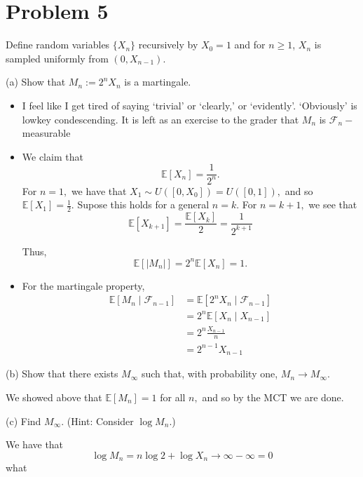 \documentclass[11pt]{article}
\newcommand{\bbE}{\mathbb{E}}
\begin{document}
\newpage

\section*{Problem 5}
Define random variables \(\{X_n\}\) recursively by \(X_0 = 1\) and for \(n \geq 1\), \(X_n\) is sampled uniformly from \((0, X_{n-1})\).

(a) Show that \(M_n := 2^n X_n\) is a martingale.
\begin{solution}
    \begin{itemize}
        \item I feel like I get tired of saying `trivial' or `clearly,' or `evidently'. `Obviously' is lowkey condescending. It is left as an exercise to the grader that $M_n$ is $\mathcal{F}_n-$measurable
        \item We claim that 
        \[\bbE[X_n] = \frac{1}{2^n}.\] For $n=1,$ we have that $X_1 \sim U([0,X_0]) = U([0,1]),$ and so $\bbE[X_1] = \frac{1}{2}.$ Supose this holds for a general $n=k.$ For $n = k+1,$ we see that 
        \[\bbE[X_{k+1}] = \frac{\bbE[X_k]}{2} = \frac{1}{2^{k+1}}\]
        
        Thus, 
        \[\bbE[|M_n|] = 2^n\bbE[X_n] = 1.\]
        \item For the martingale property, 
        \begin{align*}
            \bbE[M_n \mid \mathcal{F}_{n-1}] &= \bbE[2^n X_n \mid \mathcal{F}_{n-1}]\\
            &= 2^n \bbE[X_{n} \mid {X}_{n-1}]\\
            &= 2^n \frac{X_{n-1}}{n}\\
            &= 2^{n-1}X_{n-1}
        \end{align*}
    \end{itemize}
\end{solution}

(b) Show that there exists \(M_\infty\) such that, with probability one, \(M_n \to M_\infty\).
\begin{solution}
    We showed above that $\bbE[M_n] = 1$ for all $n,$ and so by the MCT we are done.
\end{solution}

(c) Find \(M_\infty\). (Hint: Consider \(\log M_n\).)
\begin{solution}
    We have that 
    \[\log M_n = n \log 2  +\log X_n\to \infty - \infty =0 \] what 
\end{solution}

\newpage
\end{document}
